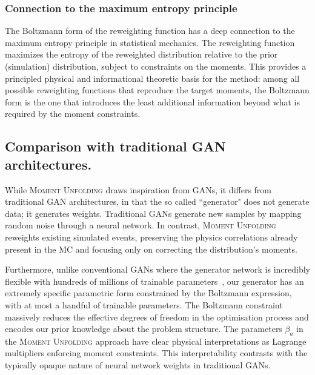         \subsubsection{Connection to the maximum entropy principle}
            The Boltzmann form of the reweighting function has a deep connection to the maximum entropy principle in statistical mechanics.
            The reweighting function maximizes the entropy of the reweighted distribution relative to the prior (simulation) distribution, subject to constraints on the moments.
            This provides a principled physical and informational theoretic basis for the method: among all possible reweighting functions that reproduce the target moments, the Boltzmann form is the one that introduces the least additional information beyond what is required by the moment constraints.

    \subsection{Comparison with traditional GAN architectures.}
        While \textsc{Moment Unfolding} draws inspiration from GANs, it differs from traditional GAN architectures, in that the so called ``generator" does not generate data; it generates weights.
        Traditional GANs generate new samples by mapping random noise through a neural network.
        In contrast, \textsc{Moment Unfolding} reweights existing simulated events, preserving the physics correlations already present in the MC and focusing only on correcting the distribution's moments.
    
        Furthermore, unlike conventional GANs where the generator network is incredibly flexible with hundreds of millions of trainable parameters~\cite{brock_large_2019, karras_analyzing_2020, Lee2022BigVGAN:Training}, our generator has an extremely specific parametric form constrained by the Boltzmann expression, with at most a handful of trainable parameters.
        The Boltzmann constraint massively reduces the effective degrees of freedom in the optimisation process and encodes our prior knowledge about the problem structure.
        The parameters $\beta_a$ in the \textsc{Moment Unfolding} approach have clear physical interpretations as Lagrange multipliers enforcing moment constraints.
        This interpretability contrasts with the typically opaque nature of neural network weights in traditional GANs.
    
